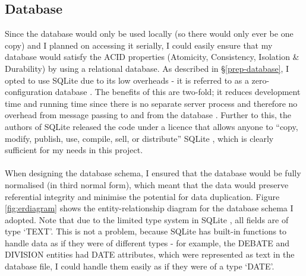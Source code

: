 \documentclass[12pt,a4paper,twoside,openright]{report}
\newcommand{\mylisting}[4]{}
\newcommand{\pylisting}[2]{\mylisting{Python}{py}{#1}{#2}}
\begin{document}
\pylisting{Function that matches an MP's name in the Hansard }{match_full_name}

\subsection{Database} \label{impl-database}

Since the database would only be used locally (so there would only ever be one copy) and I planned on accessing it serially, I could easily ensure that my database would satisfy the ACID properties (Atomicity, Consistency, Isolation \& Durability) by using a relational database. As described in \S\ref{prep-database}, I opted to use SQLite due to its low overheads - it is referred to as a zero-configuration database \cite{sqlitezeroconfig}. The benefits of this are two-fold; it reduces development time and running time since there is no separate server process and therefore no overhead from message passing to and from the database \cite{sqliteserverless}. Further to this, the authors of SQLite released the code under a licence that allows anyone to ``copy, modify, publish, use, compile, sell, or distribute'' SQLite \cite{sqlitelicence}, which is clearly sufficient for my needs in this project.
\\\\
When designing the database schema, I ensured that the database would be fully normalised (in third normal form), which meant that the data would preserve referential integrity and minimise the potential for data duplication. Figure \ref{fig:erdiagram} shows the entity-relationship diagram for the database schema I adopted. Note that due to the limited type system in SQLite \cite{sqlitetypes}, all fields are of type `TEXT'. This is not a problem, because SQLite has built-in functions to handle data as if they were of different types - for example, the DEBATE and DIVISION entities had DATE attributes, which were represented as text in the database file, I could handle them easily as if they were of a type `DATE'.
\\\\
\end{document}
